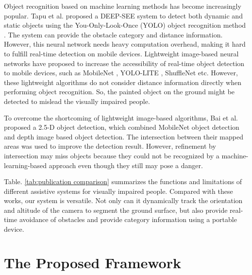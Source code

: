 \documentclass{ieeeaccess}
\begin{document}
Object recognition based on machine learning methods has become increasingly popular. Tapu et al. \cite{tapu2017deep} proposed a DEEP-SEE system to detect both dynamic and static objects using the You-Only-Look-Once (YOLO) object recognition method \cite{redmon2016you}. The system can provide the obstacle category and distance information. However, this neural network needs heavy computation overhead, making it hard to fulfill real-time detection on mobile devices. Lightweight image-based neural networks have proposed to increase the accessibility of real-time object detection to mobile devices, such as MobileNet \cite{howard2017mobilenets}, YOLO-LITE \cite{DBLP:journals/corr/abs-1811-05588}, ShuffleNet \cite{zhang2018shufflenet} etc. However, these lightweight algorithms do not consider distance information directly when performing object recognition. So, the painted object on the ground might be detected to mislead the visually impaired people.

To overcome the shortcoming of lightweight image-based algorithms, Bai et al. \cite{bai2019wearable} proposed a 2.5-D object detection, which combined MobileNet object detection and depth image based object detection. The intersection between their mapped areas was used to improve the detection result. However, refinement by intersection may miss objects because they could not be recognized by a machine-learning-based approach even though they still may pose a danger. 

Table. \ref{tab:publication comparison} summarizes the functions and limitations of different assistive systems for visually impaired people. Compared with these works, our system is versatile. Not only can it dynamically track the orientation and altitude of the camera to segment the ground surface, but also provide real-time avoidance of obstacles and provide category information using a portable device.

\section{The Proposed Framework} \label{section:framework}
\end{document}
